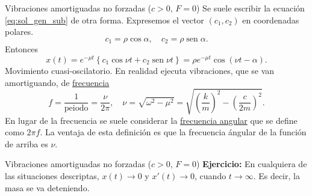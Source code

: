 \documentclass[handout,hyperref={colorlinks=true}]{beamer}
\DeclareMathOperator{\sen}{sen}
\begin{document}
\begin{frame}{ Vibraciones amortiguadas no forzadas ($c>0$, $F=0$) }
Se suele escribir la ecuación \eqref{eq:sol_gen_sub} de otra forma. Expresemos el vector $(c_1,c_2)$ en 
coordenadas polares. 
\[
c_1=\rho\cos\alpha,\quad c_2=\rho\sen\alpha.
\]
Entonces
\[
 x(t)=e^{-\mu t}\left\{ c_1\cos \nu t+c_2\sen \nu t    \right\}=\boxed{\rho e^{-\mu t}\cos(\nu t-\alpha)}.
\]
Movimiento cuasi-oscilatorio. En realidad ejecuta vibraciones, que se van amortiguando, de \href{http://es.wikipedia.org/wiki/Frecuencia}{frecuencia}
\[
  f=\frac{1}{\text{peiodo}}=\frac{\nu}{2\pi},\quad \nu=\sqrt{\omega^2-\mu^2}=\sqrt{\left(\frac{k}{m}\right)^2-
  \left(\frac{c}{2m}\right)^2}.
\]
En lugar de la frecuencia se suele considerar la 
\href{http://luz.izt.uam.mx/mediawiki/index.php/Frecuencia_angular}{frecuencia angular} que se define como 
$2\pi f$. La ventaja de esta definición es que la frecuencia ángular de la función de arriba es
$\nu$. 
\end{frame}



\begin{frame}{ Vibraciones amortiguadas no forzadas ($c>0$, $F=0$) }
\textbf{Ejercicio:} En cualquiera de las situaciones descriptas, $x(t)\to 0$ y $x'(t)\to 0$, cuando $t\to\infty$. 
Es decir, la masa se va deteniendo.                                                                                                                                                                                                                                                                         
 


\end{frame}


\end{document}
